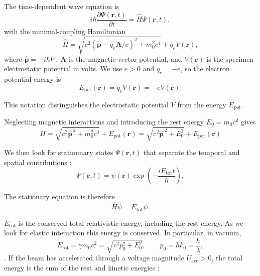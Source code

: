 \documentclass[12pt]{article}
\begin{document}
The time-dependent wave equation is
\begin{equation}
i\hbar\frac{\partial\Psi(\mathbf r,t)}{\partial t}
=
\hat H\Psi(\mathbf r,t),
\label{eq:app_time_dependent_wave_equation}
\end{equation}
with the minimal-coupling Hamiltonian
\begin{equation}
\hat H
=
\sqrt{
c^2\left(\hat{\mathbf p}-q_e\mathbf A/c\right)^2+m_0^2c^4
}
+
q_eV(\mathbf r),
\label{eq:app_minimal_coupling_hamiltonian}
\end{equation}
where $\hat{\mathbf p}=-i\hbar\nabla$, $\mathbf A$ is the magnetic vector
potential, and $V(\mathbf r)$ is the specimen electrostatic potential in
volts. We use $e>0$ and $q_e=-e$, so the electron potential energy is
\begin{equation}
E_{\mathrm{pot}}(\mathbf r)
=
q_eV(\mathbf r)
=
-eV(\mathbf r).
\label{eq:app_electron_potential_energy}
\end{equation}


This notation distinguishes the electrostatic potential $V$ from the energy
$E_{\mathrm{pot}}$.

Neglecting magnetic interactions and introducing the rest energy $ E_0 = m_0 c^2$ gives
\begin{equation}
\hat H
=
\sqrt{c^2\hat{\mathbf p}^{\,2}+m_0^2c^4}
+
E_{\mathrm{pot}}(\mathbf r) = \sqrt{c^2\hat{\mathbf p}^{\,2}+E_0^2}
+
E_{\mathrm{pot}}(\mathbf r)
\label{eq:app_relativistic_hamiltonian}
\end{equation}

We then look for stationnary states $\Psi(\mathbf r,t)$ that separate the temporal and spatial contributions : 
\begin{equation}
\Psi(\mathbf r,t)
=
\psi(\mathbf r)
\exp\left(-\frac{iE_{\mathrm{tot}}t}{\hbar}\right),
\label{eq:app_stationary_ansatz}
\end{equation}

 The stationary equation is therefore
\begin{equation}
\hat H\psi=E_{\mathrm{tot}}\psi.
\label{eq:app_stationary_equation}
\end{equation}

$E_{\mathrm{tot}}$ is the conserved total relativistic energy, including
the rest energy. As we look for elastic interaction this energy is conserved. In particular, 
in vacuum,
\begin{equation}
E_{\mathrm{tot}}
=
\gamma m_0c^2
=
\sqrt{c^2p_0^2+E_0^2},
\qquad
p_0=hk_0=\frac{h}{\lambda},
\label{eq:app_vacuum_energy_momentum}
\end{equation}. 
If the beam has accelerated through a voltage magnitude $U_{\mathrm{acc}}>0$, the total energy is the sum of the rest and kinetic energies : 
\end{document}
